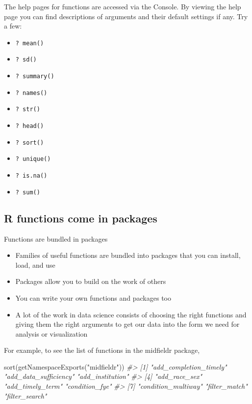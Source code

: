 \documentclass[
]{book}
\newenvironment{Shaded}{\begin{snugshade}}{\end{snugshade}}
\newcommand{\CommentTok}[1]{\textcolor[rgb]{0.56,0.35,0.01}{\textit{#1}}}
\newcommand{\FunctionTok}[1]{\textcolor[rgb]{0.00,0.00,0.00}{#1}}
\newcommand{\NormalTok}[1]{#1}
\newcommand{\StringTok}[1]{\textcolor[rgb]{0.31,0.60,0.02}{#1}}
\providecommand{\tightlist}{%
  \setlength{\itemsep}{0pt}\setlength{\parskip}{0pt}}
\begin{document}
The help pages for functions are accessed via the Console. By viewing the help page you can find descriptions of arguments and their default settings if any. Try a few:

\begin{itemize}
\tightlist
\item
  \texttt{?\ mean()}
\item
  \texttt{?\ sd()}
\item
  \texttt{?\ summary()}
\item
  \texttt{?\ names()}
\item
  \texttt{?\ str()}
\item
  \texttt{?\ head()}
\item
  \texttt{?\ sort()}
\item
  \texttt{?\ unique()}
\item
  \texttt{?\ is.na()}
\item
  \texttt{?\ sum()}
\end{itemize}

\hypertarget{r-functions-come-in-packages}{%
\subsection{R functions come in packages}\label{r-functions-come-in-packages}}

Functions are bundled in packages

\begin{itemize}
\tightlist
\item
  Families of useful functions are bundled into packages that you can install, load, and use
\item
  Packages allow you to build on the work of others
\item
  You can write your own functions and packages too
\item
  A lot of the work in data science consists of choosing the right functions and giving them the right arguments to get our data into the form we need for analysis or visualization
\end{itemize}

For example, to see the list of functions in the midfieldr package,

\begin{Shaded}
\begin{Highlighting}[]
\FunctionTok{sort}\NormalTok{(}\FunctionTok{getNamespaceExports}\NormalTok{(}\StringTok{"midfieldr"}\NormalTok{))}
\CommentTok{\#\textgreater{} [1] "add\_completion\_timely" "add\_data\_sufficiency"  "add\_institution"      }
\CommentTok{\#\textgreater{} [4] "add\_race\_sex"          "add\_timely\_term"       "condition\_fye"        }
\CommentTok{\#\textgreater{} [7] "condition\_multiway"    "filter\_match"          "filter\_search"}
\end{Highlighting}
\end{Shaded}
\end{document}
